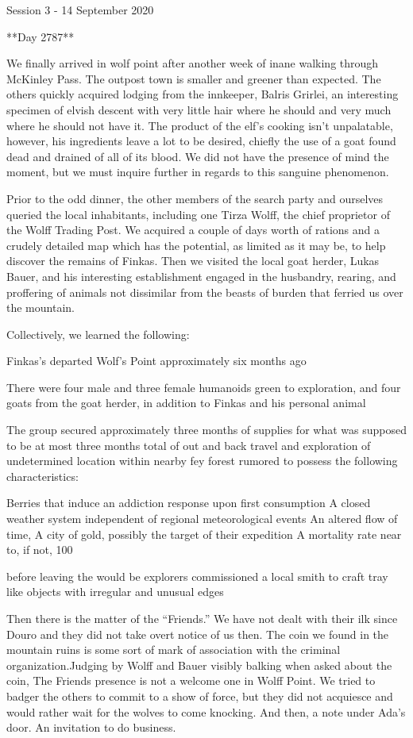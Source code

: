 Session 3 - 14 September 2020

**Day 2787**

We finally arrived in wolf point after another week of inane walking through McKinley Pass.  The outpost town is smaller and greener than expected. The others quickly acquired lodging from the innkeeper, Balris Grirlei, an interesting specimen of elvish descent with very little hair where he should and very much where he should not have it.  The product of the elf’s cooking isn’t unpalatable, however, his ingredients leave a lot to be desired, chiefly the use of a goat found dead and drained of all of its blood.  We did not have the presence of mind the moment, but we must inquire further in regards to this sanguine phenomenon.

Prior to the odd dinner, the other members of the search party and ourselves queried the local inhabitants, including one Tirza Wolff, the chief proprietor of the Wolff Trading Post.  We acquired a couple of days worth of rations and a crudely detailed map which has the potential, as limited as it may be, to help discover the remains of Finkas. Then we visited the local goat herder, Lukas Bauer, and his interesting establishment engaged in the husbandry, rearing, and proffering of animals not dissimilar from the beasts of burden that ferried us over the mountain.

Collectively, we learned the following:

Finkas’s departed Wolf’s Point approximately six months ago

There were four male and three female humanoids green to exploration, and four goats from the goat herder, in addition to Finkas and his personal animal

The group secured approximately three months of supplies for what was supposed to be at most three months total of out and back travel and exploration of undetermined location within nearby fey forest rumored to possess the following characteristics:

  Berries that induce an addiction response upon first consumption
  A closed weather system independent of regional meteorological events
  An altered flow of time, 
  A city of gold, possibly the target of their expedition
  A mortality rate near to, if not, 100%

before leaving the would be explorers commissioned a local smith to craft tray like objects with irregular and unusual edges

Then there is the matter of the “Friends.”  We have not dealt with their ilk since Douro and they did not take overt notice of us then.  The coin we found in the mountain ruins is some sort of mark of association with the criminal organization.Judging by Wolff and Bauer visibly balking when asked about the coin, The Friends presence is not a welcome one in Wolff Point.  We tried to badger the others to commit to a show of force, but they did not acquiesce and would rather wait for the wolves to come knocking.  And then, a note under Ada’s door.  An invitation to do business.

